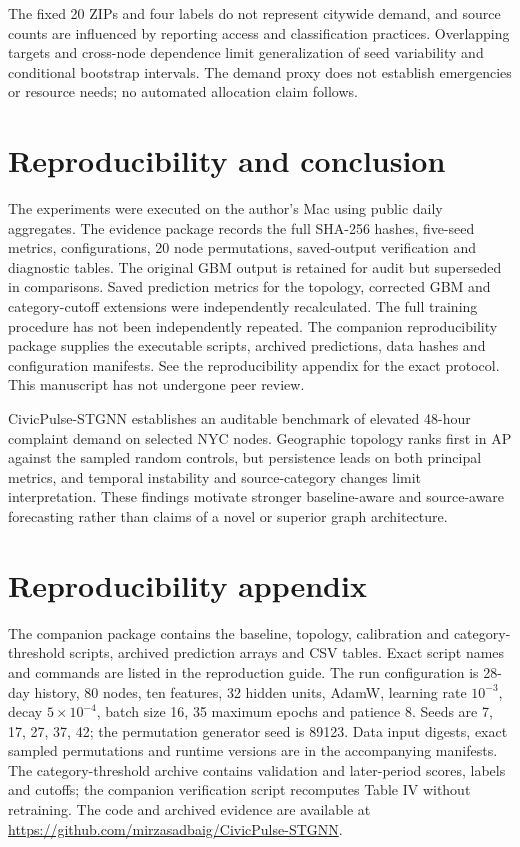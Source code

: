 \documentclass[conference]{IEEEtran}
\begin{document}
The fixed 20 ZIPs and four labels do not represent citywide demand, and source counts are influenced by reporting access and classification practices. Overlapping targets and cross-node dependence limit generalization of seed variability and conditional bootstrap intervals. The demand proxy does not establish emergencies or resource needs; no automated allocation claim follows.

\section{Reproducibility and conclusion}
The experiments were executed on the author's Mac using public daily aggregates. The evidence package records the full SHA-256 hashes, five-seed metrics, configurations, 20 node permutations, saved-output verification and diagnostic tables. The original GBM output is retained for audit but superseded in comparisons. Saved prediction metrics for the topology, corrected GBM and category-cutoff extensions were independently recalculated. The full training procedure has not been independently repeated. The companion reproducibility package supplies the executable scripts, archived predictions, data hashes and configuration manifests. See the reproducibility appendix for the exact protocol. This manuscript has not undergone peer review.

\balance
CivicPulse-STGNN establishes an auditable benchmark of elevated 48-hour complaint demand on selected NYC nodes. Geographic topology ranks first in AP against the sampled random controls, but persistence leads on both principal metrics, and temporal instability and source-category changes limit interpretation. These findings motivate stronger baseline-aware and source-aware forecasting rather than claims of a novel or superior graph architecture.

\section*{Reproducibility appendix}
The companion package contains the baseline, topology, calibration and category-threshold scripts, archived prediction arrays and CSV tables. Exact script names and commands are listed in the reproduction guide. The run configuration is 28-day history, 80 nodes, ten features, 32 hidden units, AdamW, learning rate $10^{-3}$, decay $5\times10^{-4}$, batch size 16, 35 maximum epochs and patience 8. Seeds are 7, 17, 27, 37, 42; the permutation generator seed is 89123. Data input digests, exact sampled permutations and runtime versions are in the accompanying manifests. The category-threshold archive contains validation and later-period scores, labels and cutoffs; the companion verification script recomputes Table IV without retraining. The code and archived evidence are available at \url{https://github.com/mirzasadbaig/CivicPulse-STGNN}.
\end{document}
